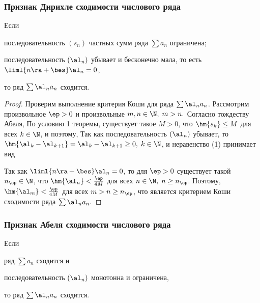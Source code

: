 \documentclass[a4paper]{article}
\begin{document}
\subsubsection{Признак Дирихле сходимости числового ряда}
\begin{theorem}
Если
\begin{nums}{-2}
\item последовательность $(s_n)$ частных сумм ряда $\sum a_n$
ограничена;
\item последовательность $(\al_n)$ убывает и бесконечно мала, то
есть $\liml{n\ra+\bes} \al_n =0$,
\end{nums} то ряд $\sum \al_n a_n$ сходится.
\end{theorem}

\begin{proof}
Проверим выполнение критерия Коши для ряда $\sum\al_n a_n$.
Рассмотрим произвольное $\ep>0$ и произвольные $m,n\in\N, \; m>n.$
Согласно тождеству Абеля,  По условию 1 теоремы,
существует такое $M>0$, что $\hm{s_k} \le M$ для всех $k\in\N$, и
поэтому,  Так как последовательность $(\al_n)$ убывает, то
$\hm{\al_k - \al_{k+1}} = \al_k - \al_{k+1} \ge 0, \; k\in\N$, и
неравенство (1) принимает вид 

Так как $\liml{n\ra+\bes}\al_n=0$, то для $\ep>0$ существует такой
$n_{\ep}\in\N$, что $\hm{\al_n} < \frac{\ep}{4M}$ для всех $n\in\N,
\; n\ge n_{\ep}$. Поэтому, $\hm{\al_m} < \frac{\ep}{4M}$ для всех
$m>n \ge n_{\ep}$, что является критерием Коши сходимости ряда $\sum
\al_n a_n.$
\end{proof}

\subsubsection{Признак Абеля сходимости числового ряда}
\begin{theorem}
Если
\begin{nums}{-2}
\item ряд $\sum a_n$ сходится и
\item последовательность $(\al_n)$ монотонна и ограничена,
\end{nums}
то ряд $\sum \al_n a_n$ сходится.
\end{theorem}
\end{document}
